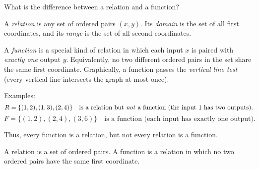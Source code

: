 \documentclass[a4paper,11pt]{article}
\begin{document}
\maketitle

\begin{problem}
What is the difference between a relation and a function?
\end{problem}

\begin{solution}
A \emph{relation} is any set of ordered pairs \((x,y)\). Its \emph{domain} is the set of all first coordinates, and its \emph{range} is the set of all second coordinates.

A \emph{function} is a special kind of relation in which each input \(x\) is paired with \emph{exactly one} output \(y\). Equivalently, no two different ordered pairs in the set share the same first coordinate. Graphically, a function passes the \emph{vertical line test} (every vertical line intersects the graph at most once).

Examples:
\[
R=\{(1,2),(1,3),(2,4)\}\quad\text{is a relation but \emph{not} a function (the input }1\text{ has two outputs).}
\]
\[
F=\{(1,2),(2,4),(3,6)\}\quad\text{is a function (each input has exactly one output).}
\]

Thus, every function is a relation, but not every relation is a function.
\end{solution}

\begin{answer}
A relation is a set of ordered pairs. A function is a relation in which no two ordered pairs have the same first coordinate.
\end{answer}
\end{document}

